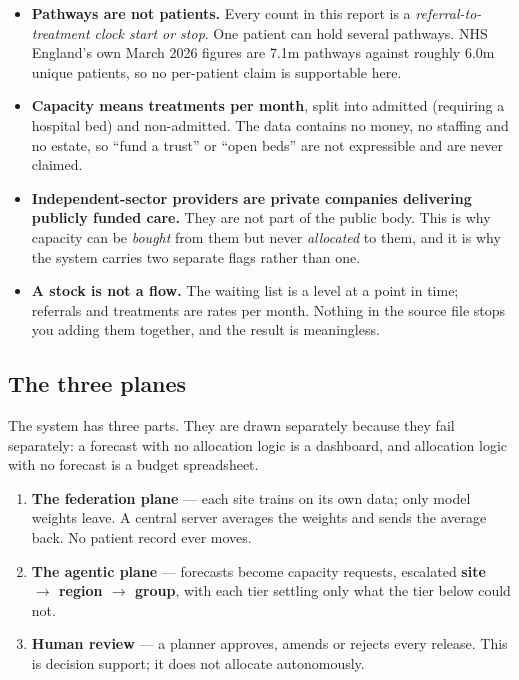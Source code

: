 \documentclass[11pt,a4paper]{article}
\begin{document}
\begin{itemize}[leftmargin=1.3em]
\item \textbf{Pathways are not patients.} Every count in this report is a \emph{referral-to-treatment
clock start or stop}. One patient can hold several pathways. NHS England's own March 2026 figures are
7.1m pathways against roughly 6.0m unique patients, so no per-patient claim is supportable here.

\item \textbf{Capacity means treatments per month}, split into admitted (requiring a hospital bed) and
non-admitted. The data contains no money, no staffing and no estate, so ``fund a trust'' or ``open
beds'' are not expressible and are never claimed.

\item \textbf{Independent-sector providers are private companies delivering publicly funded care.}
They are not part of the public body. This is why capacity can be \emph{bought} from them but never
\emph{allocated} to them, and it is why the system carries two separate flags rather than one.

\item \textbf{A stock is not a flow.} The waiting list is a level at a point in time; referrals and
treatments are rates per month. Nothing in the source file stops you adding them together, and the
result is meaningless.
\end{itemize}

\subsection{The three planes}

The system has three parts. They are drawn separately because they fail separately: a forecast with no
allocation logic is a dashboard, and allocation logic with no forecast is a budget spreadsheet.

\begin{enumerate}[leftmargin=1.5em]
\item \textbf{The federation plane} --- each site trains on its own data; only model weights leave.
A central server averages the weights and sends the average back. No patient record ever moves.

\item \textbf{The agentic plane} --- forecasts become capacity requests, escalated
\textbf{site $\rightarrow$ region $\rightarrow$ group}, with each tier settling only what the tier
below could not.

\item \textbf{Human review} --- a planner approves, amends or rejects every release. This is decision
support; it does not allocate autonomously.
\end{enumerate}
\end{document}
